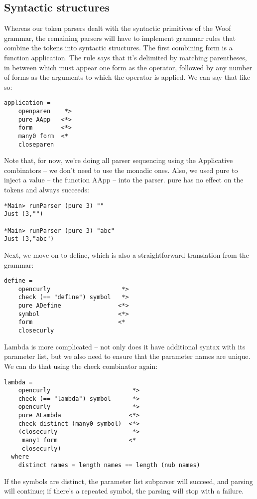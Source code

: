 \documentclass{tmr}
\begin{document}
\subsection{Syntactic structures}
Whereas our token parsers dealt with the syntactic primitives of the Woof grammar, 
the remaining parsers will have to implement grammar rules that combine the tokens
into syntactic structures.
The first combining form is a function application.  The rule says that it's delimited
by matching parentheses, in between which must appear one form as the operator, followed
by any number of forms as the arguments to which the operator is applied.  We can
say that like so:
\begin{verbatim}
application =
    openparen    *>
    pure AApp   <*>
    form        <*>
    many0 form  <*
    closeparen
\end{verbatim}
Note that, for now, we're doing all parser sequencing using the Applicative
combinators -- we don't need to use the monadic ones.  Also, we used pure to
inject a value -- the function AApp -- into the parser.  pure has no effect on
the tokens and always succeeds:
\begin{verbatim}
*Main> runParser (pure 3) ""
Just (3,"")

*Main> runParser (pure 3) "abc"
Just (3,"abc")
\end{verbatim}

Next, we move on to define, which is also a straightforward translation from the grammar:
\begin{verbatim}
define =
    opencurly                    *>
    check (== "define") symbol   *>
    pure ADefine                <*>
    symbol                      <*>
    form                        <*
    closecurly
\end{verbatim}

Lambda is more complicated -- not only does it have additional syntax with its parameter list,
but we also need to ensure that the parameter names are unique.  We can do that using the 
check combinator again:
\begin{verbatim}
lambda = 
    opencurly                       *>
    check (== "lambda") symbol      *>
    opencurly                       *>
    pure ALambda                   <*>
    check distinct (many0 symbol)  <*>
    (closecurly                     *>
     many1 form                    <*
     closecurly)
  where
    distinct names = length names == length (nub names)
\end{verbatim}
If the symbols are distinct, the parameter list subparser will succeed, and parsing will
continue; if there's a repeated symbol, the parsing will stop with a failure.
\end{document}
